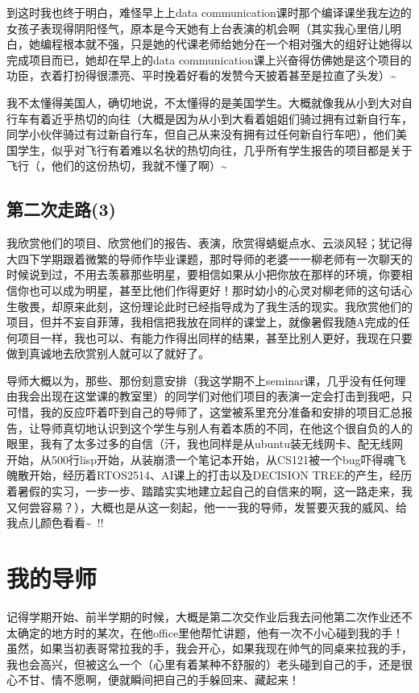 \documentclass[12pt]{book}
\begin{document}
到这时我也终于明白，难怪早上上data communication课时那个编译课坐我左边的女孩子表现得阴阳怪气，原本是今天她有上台表演的机会啊（其实我心里倍儿明白，她编程根本就不强，只是她的代课老师给她分在一个相对强大的组好让她得以完成项目而已，她却在早上的data communication课上兴奋得仿佛她是这个项目的功臣，衣着打扮得很漂亮、平时挽着好看的发赞今天披着甚至是拉直了头发）\textasciitilde{}~

我不太懂得美国人，确切地说，不太懂得的是美国学生。大概就像我从小到大对自行车有着近乎热切的向往（大概是因为从小到大看着姐姐们骑过拥有过新自行车，同学小伙伴骑过有过新自行车，但自己从来没有拥有过任何新自行车吧），他们美国学生，似乎对飞行有着难以名状的热切向往，几乎所有学生报告的项目都是关于飞行（，他们的这份热切，我就不懂了啊）\textasciitilde{}~

\section{第二次走路(3)}
\label{sec-25-3}

我欣赏他们的项目、欣赏他们的报告、表演，欣赏得蜻蜓点水、云淡风轻；犹记得大四下学期跟着微繁的导师作毕业课题，那时导师的老婆一一柳老师有一次聊天的时候说到过，不用去羡慕那些明星，要相信如果从小把你放在那样的环境，你要相信你也可以成为明星，甚至比他们作得更好！那时幼小的心灵对柳老师的这句话心生敬畏，却原来此刻，这份理论此时已经指导成为了我生活的现实。我欣赏他们的项目，但并不妄自菲薄，我相信把我放在同样的课堂上，就像暑假我随A完成的任何项目一样，我也可以、有能力作得出同样的结果，甚至比别人更好，我现在只要做到真诚地去欣赏别人就可以了就好了。

导师大概以为，那些、那份刻意安排（我这学期不上seminar课，几乎没有任何理由我会出现在这堂课的教室里）的同学们对他们项目的表演一定会打击到我吧，只可惜，我的反应吓着吓到自己的导师了，这堂被系里充分准备和安排的项目汇总报告，让导师真切地认识到这个学生与别人有着本质的不同，在他这个很自负的人的眼里，我有了太多过多的自信（汗，我也同样是从ubuntu装无线网卡、配无线网开始，从500行lisp开始，从装崩溃一个笔记本开始，从CS121被一个bug吓得魂飞魄散开始，经历着RTOS2514、AI课上的打击以及DECISION TREE的产生，经历着暑假的实习，一步一步、踏踏实实地建立起自己的自信来的啊，这一路走来，我又何尝容易？），大概也是从这一刻起，他一一我的导师，发誓要灭我的威风、给我点儿颜色看看\textasciitilde{}~!!

\chapter{我的导师}
\label{sec-26}

记得学期开始、前半学期的时候，大概是第二次交作业后我去问他第二次作业还不太确定的地方时的某次，在他office里他帮忙讲题，他有一次不小心碰到我的手！虽然，如果当初表哥常拉我的手，我会开心，如果我现在帅气的同桌来拉我的手，我也会高兴，但被这么一个（心里有着某种不舒服的）老头碰到自己的手，还是很心不甘、情不愿啊，便就瞬间把自己的手躲回来、藏起来！
\end{document}
